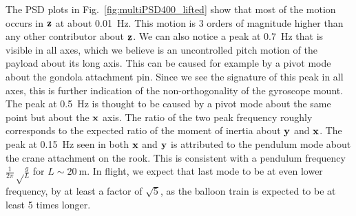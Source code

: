 The PSD plots in Fig.~\ref{fig:multiPSD400_lifted} show that most of the motion occurs in $\textrm{\textbf{z}}$ at about \SI{0.01}{\hertz}. This motion is 3 orders of magnitude higher than any other contributor about $\textrm{\textbf{z}}$. We can also notice a peak at \SI{0.7}{\hertz} that is visible in all axes, which we believe is an uncontrolled pitch motion of the payload about its long axis. This can be caused for example by a pivot mode about the gondola attachment pin. Since we see the signature of this peak in all axes, this is further indication of the non-orthogonality of the gyroscope mount. The peak at \SI{0.5}{\hertz} is thought to be caused by a pivot mode about the same point but about the $\textrm{\textbf{x}}$ axis. The ratio of the two peak frequency roughly corresponds to the expected ratio of the moment of inertia about $\textrm{\textbf{y}}$ and $\textrm{\textbf{x}}$. The peak at \SI{0.15}{\hertz} seen in both $\textrm{\textbf{x}}$ and $\textrm{\textbf{y}}$ is attributed to the pendulum mode about the crane attachment on the rook. This is consistent with a pendulum frequency $\frac{1}{2\pi}\sqrt\frac{g}{L}$ for $L\sim\SI{20}{\meter}$. In flight, we expect that last mode to be at even lower frequency, by at least a factor of $\sqrt{5}$, as the balloon train is expected to be at least 5 times longer.


